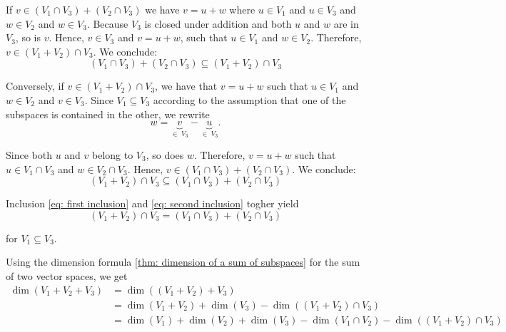 \begin{xrcs}
  \begin{xprf}
    If $v \in (V_1 \cap V_3) + (V_2 \cap V_3)$ we have $v = u + w$ where $u \in V_1$ and $u \in V_3$ and $w \in V_2$ and $w \in V_3$.
    Because $V_3$ is closed under addition and both $u$ and $w$ are in $V_3$, so is $v$. Hence, $v \in V_3$ and $v=u+w$, such that $u \in V_1$ and $w \in V_2$. Therefore, $v \in (V_1 + V_2) \cap V_3$. We conclude:
    \begin{equation}
      \label{eq: first inclusion}
      (V_1 \cap V_3) + (V_2 \cap V_3) \subseteq (V_1 + V_2) \cap V_3
    \end{equation}

    Conversely, if $v \in (V_1 + V_2) \cap V_3$, we have that $v = u + w$ such that $u \in V_1$ and $w \in V_2$ and $v \in V_3$. Since $V_1 \subseteq V_3$ according to the assumption that one of the subspaces is contained in the other, we rewrite
    \begin{equation}
      w = \underbrace{v}_{\in \; V_3}-\underbrace{u}_{\in \; V_3}.
    \end{equation}

    Since both $u$ and $v$ belong to $V_3$, so does $w$. Therefore, $v=u+w$ such that $u \in V_1 \cap V_3$ and $w \in V_2 \cap V_3$. Hence, $v \in (V_1 \cap V_3) + (V_2 \cap V_3)$. We conclude:
    \begin{equation}
      \label{eq: second inclusion}
      (V_1 + V_2) \cap V_3 \subseteq (V_1 \cap V_3) + (V_2 \cap V_3)
    \end{equation}

    Inclusion \eqref{eq: first inclusion} and \eqref{eq: second inclusion} togher yield
    \begin{equation}
      (V_1 + V_2) \cap V_3 = (V_1 \cap V_3) + (V_2 \cap V_3)
    \end{equation}

    for $V_1 \subseteq V_3$.
  \end{xprf}


  Using the dimension formula \eqref{thm: dimension of a sum of subspaces} for the sum of two vector spaces, we get
  \begin{equation}
    \begin{aligned}
      \dim (V_1 + V_2 + V_3) &= \dim ((V_1+V_2) + V_3) \\
        &= \dim (V_1 + V_2) + \dim (V_3) - \dim((V_1 +V_2) \cap V_3) \\
        &= \dim (V_1) + \dim (V_2) + \dim (V_3) - \dim (V_1 \cap V_2) - \dim ((V_1 + V_2) \cap V_3)
    \end{aligned}
  \end{equation}


\end{xrcs}
